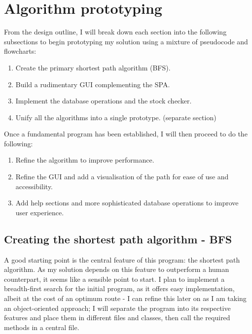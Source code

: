\newpage
\section{Algorithm prototyping}

From the design outline, I will break down each section into the following subsections to begin prototyping my solution using a mixture of pseudocode and flowcharts:

\begin{enumerate}
    \item Create the primary shortest path algorithm (BFS).
    \item Build a rudimentary GUI complementing the SPA.
    \item Implement the database operations and the stock checker.
    \item Unify all the algorithms into a single prototype. (separate section)
\end{enumerate}

Once a fundamental program has been established, I will then proceed to do the following:

\begin{enumerate}
    \item Refine the algorithm to improve performance.
    \item Refine the GUI and add a visualisation of the path for ease of use and accessibility.
    \item Add help sections and more sophisticated database operations to improve user experience.
\end{enumerate}

\subsection{Creating the shortest path algorithm - BFS}

A good starting point is the central feature of this program: the shortest path algorithm. As my solution depends on this feature to outperform a human counterpart, it seems like a sensible point to start. I plan to implement a breadth-first search for the initial program, as it offers easy implementation, albeit at the cost of an optimum route - I can refine this later on as I am taking an object-oriented approach; I will separate the program into its respective features and place them in different files and classes, then call the required methods in a central file.

